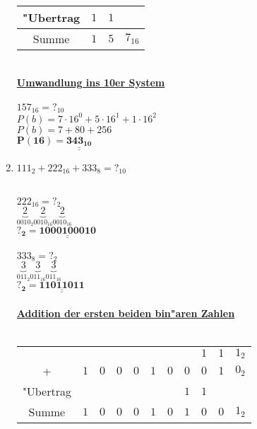 \documentclass[a4paper,10pt]{article}
\def\doubleunderline#1{\underline{\underline{#1}}}
\begin{document}
\begin{enumerate}
{\begin{tabular}{c@{\,}c@{\,}c@{\,}c}
		\hline
		"Ubertrag  & $1$ & $1$  &  \\
		\hline
		Summe & $1$ & $5$ & $7_{16}$ \\
		\hline
		\hline		
		\end{tabular}
		\vspace{4mm}
		\\
		 \textbf{\underline{Umwandlung ins 10er System}} \\
		 \\
	 	 $157_{16} = ?_{10}$ \\
		 $P(b)= 7 \cdot 16^0 + 5 \cdot 16^1 + 1 \cdot 16^2$ \\
		 $P(b)= 7 + 80 + 256 $ \\
		 $\mathbf{P(16)= \doubleunderline{343_{10}}}$ \\			 
	 }
\item $111_{2} + 222_{16} + 333_{8} = ?_{10}$ \\  \\   %
	 {\color{ForestGreen}
	 	 $222_{16} = ?_{2}$ \\
		 $\underbrace{2}_\text{$0010_{2}$}\underbrace{2}_\text{$0010_{16}$}\underbrace{2}_\text{$0010_{16}$}$ \\
		 $\mathbf{?_{2} = \doubleunderline{1000100010}}$ \\
		 \\
	 	 $333_{8} = ?_{2}$ \\
		 $\underbrace{3}_\text{$011_{2}$}\underbrace{3}_\text{$011_{16}$}\underbrace{3}_\text{$011_{16}$}$ \\
		 $\mathbf{?_{2} = \doubleunderline{11011011}}$ \\
		 \\
		 \textbf{\underline{Addition der ersten beiden bin"aren Zahlen}} \\
		 \\
		 \begin{tabular}{c@{\,}c@{\,}c@{\,}c@{\,}c@{\,}c@{\,}c@{\,}c@{\,}c@{\,}c@{\,}c}
		&  &  &  &  &  &  &  &  $1$ & $1$ & $1_{2}$ \\
		+ & $1$ & $0$ & $0$ & $0$ & $1$& $0$ & $0$ & $0$ & $1$ & $0_{2}$ \\
		\hline
		"Ubertrag  & & & & & & & $1$ & $1$ &  &  \\
		\hline
		Summe & $1$ & $0$ & $0$ & $0$ & $1$ & $0$ & $1$ & $0$ & $0$ & $1_{2}$ \\
		\hline
		\hline		
		\end{tabular}
		\\
		\vspace{4mm}
		\\
}
\end{enumerate}
\end{document}
